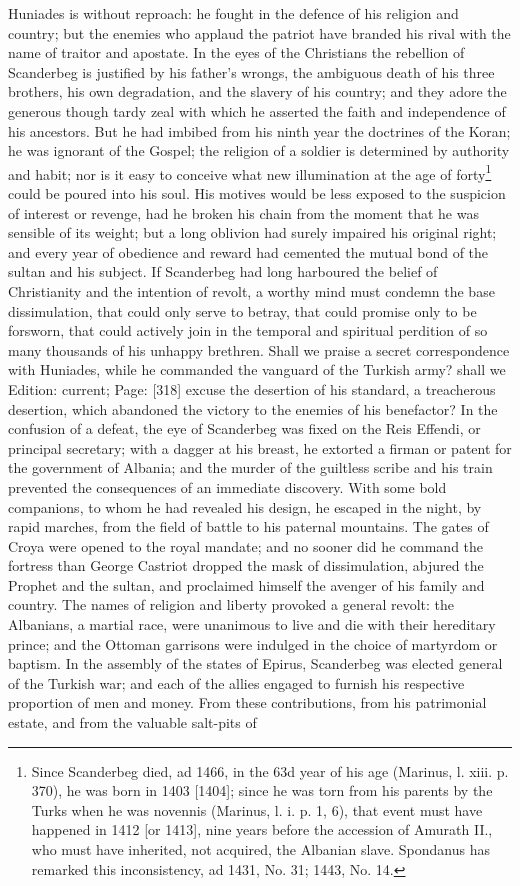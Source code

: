 Huniades is without reproach: he fought in the defence of his religion and country; but the enemies who applaud the patriot have branded his rival with the name of traitor and apostate. In the eyes of the Christians the rebellion of Scanderbeg is justified by his father\texthebrew{}’s wrongs, the ambiguous death of his three brothers, his own degradation, and the slavery of his country; and they adore the generous though tardy zeal with which he asserted the faith and independence of his ancestors. But he had imbibed from his ninth year the doctrines of the Koran; he was ignorant of the Gospel; the religion of a soldier is determined by authority and habit; nor is it easy to conceive what new illumination at the age of forty\footnote{Since Scanderbeg died, ad 1466, in the 63d year of his age (Marinus, l. xiii. p. 370), he was born in 1403 [1404]; since he was torn from his parents by the Turks when he was novennis (Marinus, l. i. p. 1, 6), that event must have happened in 1412 [or 1413], nine years before the accession of Amurath II., who must have inherited, not acquired, the Albanian slave. Spondanus has remarked this inconsistency, ad 1431, No. 31; 1443, No. 14.} could be poured into his soul. His motives would be less exposed to the suspicion of interest or revenge, had he broken his chain from the moment that he was sensible of its weight; but a long oblivion had surely impaired his original right; and every year of obedience and reward had cemented the mutual bond of the sultan and his subject. If Scanderbeg had long harboured the belief of Christianity and the intention of revolt, a worthy mind must condemn the base dissimulation, that could only serve to betray, that could promise only to be forsworn, that could actively join in the temporal and spiritual perdition of so many thousands of his unhappy brethren. Shall we praise a secret correspondence with Huniades, while he commanded the vanguard of the Turkish army? shall we Edition: current; Page: [318] excuse the desertion of his standard, a treacherous desertion, which abandoned the victory to the enemies of his benefactor? In the confusion of a defeat, the eye of Scanderbeg was fixed on the Reis Effendi, or principal secretary; with a dagger at his breast, he extorted a firman or patent for the government of Albania; and the murder of the guiltless scribe and his train prevented the consequences of an immediate discovery. With some bold companions, to whom he had revealed his design, he escaped in the night, by rapid marches, from the field of battle to his paternal mountains. The gates of Croya were opened to the royal mandate; and no sooner did he command the fortress than George Castriot dropped the mask of dissimulation, abjured the Prophet and the sultan, and proclaimed himself the avenger of his family and country. The names of religion and liberty provoked a general revolt: the Albanians, a martial race, were unanimous to live and die with their hereditary prince; and the Ottoman garrisons were indulged in the choice of martyrdom or baptism. In the assembly of the states of Epirus, Scanderbeg was elected general of the Turkish war; and each of the allies engaged to furnish his respective proportion of men and money. From these contributions, from his patrimonial estate, and from the valuable salt-pits of 